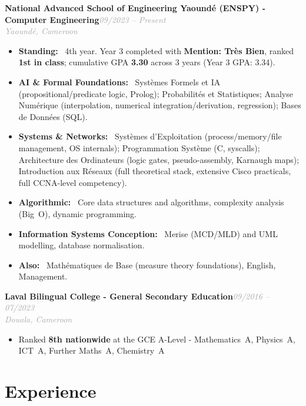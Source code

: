 \documentclass[10pt, a4paper]{article}
\newcommand{\entryhead}[2]{%
  \noindent\textbf{#1}\hfill{\small\textit{\textcolor{darkgray}{#2}}}\\[-4pt]%
}
\newcommand{\entrysub}[1]{%
  {\small\textit{\textcolor{darkgray}{#1}}}\\[2pt]%
}
\newcommand{\blabel}[1]{\textbf{#1}\ }
\begin{document}
\entryhead{National Advanced School of Engineering Yaoundé (ENSPY) - Computer Engineering}{09/2023 -- Present}
\entrysub{Yaoundé, Cameroon}
\begin{itemize}
  \item \blabel{Standing:} 4th year. Year 3 completed with \textbf{Mention: Très Bien}, ranked
        \textbf{1st in class}; cumulative GPA \textbf{3.30} across 3 years (Year 3 GPA: 3.34).
  \item \blabel{AI \& Formal Foundations:} Systèmes Formels et IA (propositional/predicate logic,
        Prolog); Probabilités et Statistiques; Analyse Numérique (interpolation, numerical
        integration/derivation, regression); Bases de Données (SQL).
  \item \blabel{Systems \& Networks:} Systèmes d'Exploitation (process/memory/file management,
        OS internals); Programmation Système (C, syscalls); Architecture des Ordinateurs
        (logic gates, pseudo-assembly, Karnaugh maps); Introduction aux Réseaux (full theoretical
        stack, extensive Cisco practicals, full CCNA-level competency).
  \item \blabel{Algorithmic:} Core data structures and algorithms, complexity analysis (Big~O),
        dynamic programming.
  \item \blabel{Information Systems Conception:} Merise (MCD/MLD) and UML modelling, database
        normalisation.
  \item \blabel{Also:} Mathématiques de Base (measure theory foundations), English, Management.
\end{itemize}

\vspace{4pt}
\entryhead{Laval Bilingual College - General Secondary Education}{09/2016 -- 07/2023}
\entrysub{Douala, Cameroon}
\begin{itemize}
  \item Ranked \textbf{8th nationwide} at the GCE A-Level -
        Mathematics~A, Physics~A, ICT~A, Further Maths~A, Chemistry~A
\end{itemize}

\section{Experience}
\end{document}
